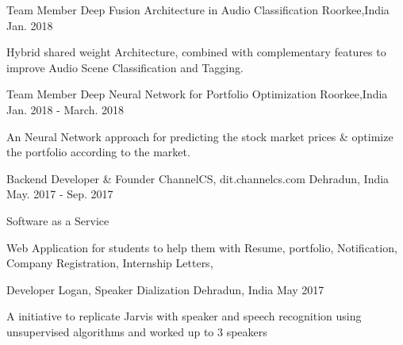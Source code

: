 \begin{cventries}
  \cventry
    {Team Member}
    {Deep Fusion Architecture in Audio Classification}
    {Roorkee,India}
    {Jan. 2018}
    {
      \begin{cvitems}
      \item {Hybrid shared weight Architecture, combined with complementary features to improve Audio Scene Classification and Tagging.}
      \end{cvitems}
    }
  \cventry
    {Team Member}
    {Deep Neural Network for Portfolio Optimization}
    {Roorkee,India}
    {Jan. 2018 - March. 2018}
    {
      \begin{cvitems}
        \item {An Neural Network approach for predicting the stock market prices \& optimize the portfolio according  to the market. }
      \end{cvitems}
    }
  \cventry
    {Backend Developer \& Founder}
    {ChannelCS, dit.channelcs.com}
    {Dehradun, India}
    {May. 2017 - Sep. 2017}
    {
      \begin{cvitems}
       \item {Software as a Service}
        \item {Web Application for students to help them with Resume, portfolio, Notification, Company Registration, Internship Letters, }
      \end{cvitems}
    }
     \cventry
    {Developer}
    {Logan, Speaker Dialization}
    {Dehradun, India}
    {May 2017}
    {
      \begin{cvitems}
        \item {A initiative to replicate Jarvis with speaker and speech recognition using unsupervised algorithms and worked up to 3 speakers}
      \end{cvitems}
    }
\end{cventries}
